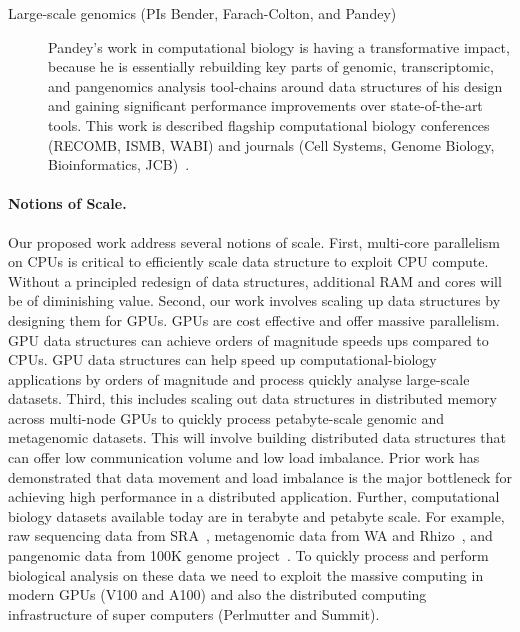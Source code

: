 \begin{description}
    \item[Large-scale genomics (PIs Bender, Farach-Colton, and Pandey)] Pandey's work in computational biology is having a transformative impact, because he is essentially rebuilding key parts of genomic, transcriptomic, and pangenomics analysis tool-chains around data structures of his design and gaining significant performance improvements over state-of-the-art tools. This work is described flagship computational biology conferences (RECOMB, ISMB, WABI) and journals (Cell Systems, Genome Biology, Bioinformatics, JCB)~\cite{PandeyABFJP18Cell,PandeyBJP17a,PandeyBJP17b,AlmodaresiPFJP19,AlmodaresiPFJP20,pandey2021variantstore,almodaresi2017rainbowfish,almodaresi2022incrementally}. 

\end{description}


\paragraph{Notions of Scale.}

Our proposed work address several notions of scale. First, multi-core parallelism on CPUs is critical to efficiently scale data structure to exploit CPU compute. Without a principled redesign of data structures, additional RAM and cores will be of diminishing value. 
Second, our work involves scaling up data structures by designing them for GPUs. GPUs are cost effective and offer massive parallelism. GPU data structures can achieve orders of magnitude speeds ups compared to CPUs. GPU data structures can help speed up computational-biology applications by orders of magnitude and process quickly analyse large-scale datasets.
Third, this includes scaling out data structures in distributed memory across multi-node GPUs to quickly process petabyte-scale genomic and metagenomic datasets. This will involve building distributed data structures that can offer low communication volume and low load imbalance. Prior work has demonstrated that data movement and load imbalance is the major bottleneck for achieving high performance in a distributed application.
Further, computational biology datasets available today are in terabyte and petabyte scale. For example, raw sequencing data from SRA~\cite{kodama2012sequence}, metagenomic data from WA and Rhizo~\cite{hofmeyr2020terabase}, and pangenomic data from 100K genome project~\cite{XXX}. To quickly process and perform biological analysis on these data we need to exploit the massive computing in modern GPUs (V100 and A100) and also the distributed computing infrastructure of super computers (Perlmutter and Summit).
